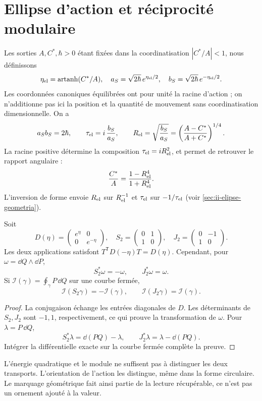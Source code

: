 \section{Ellipse d’action et réciprocité modulaire}
\label{sec:ellipse}
Les sorties $A,C^*,\hbar>0$ étant fixées dans la coordinatisation
$|C^*/A|<1$, nous définissons
\[
\eta_{\rm el}=\operatorname{artanh}(C^*/A),\quad
a_S=\sqrt{2\hbar}\,e^{\eta_{\rm el}/2},\quad
b_S=\sqrt{2\hbar}\,e^{-\eta_{\rm el}/2}.
\]
Les coordonnées canoniques équilibrées ont pour unité la racine d’action ;
on n’additionne pas ici la position et la quantité de mouvement sans coordinatisation dimensionnelle.
On a
\[
a_Sb_S=2\hbar,\qquad
\tau_{\rm el}=i\,\frac{b_S}{a_S},\qquad
R_{\rm el}=\sqrt{\frac{b_S}{a_S}}
=\left(\frac{A-C^*}{A+C^*}\right)^{1/4}.
\]
La racine positive détermine la composition $\tau_{\rm el}=iR_{\rm el}^2$,
et permet de retrouver le rapport angulaire :
\[
\frac{C^*}{A}=\frac{1-R_{\rm el}^4}{1+R_{\rm el}^4}.
\]
L’inversion de forme envoie $R_{\rm el}$ sur $R_{\rm el}^{-1}$ et
$\tau_{\rm el}$ sur $-1/\tau_{\rm el}$ (voir \ref{sec:ii-elipse-geometria}).

\begin{proposition}
Soit
\[
D(\eta)=\begin{pmatrix}e^\eta&0\\0&e^{-\eta}\end{pmatrix},
\quad
S_2=\begin{pmatrix}0&1\\1&0\end{pmatrix},
\quad
J_2=\begin{pmatrix}0&-1\\1&0\end{pmatrix}.
\]
Les deux applications satisfont $T^{\mathsf T}D(-\eta)T=D(\eta)$.
Cependant, pour $\omega=\dd Q\wedge\dd P$,
\[
S_2^*\omega=-\omega,\qquad J_2^*\omega=\omega.
\]
Si $\mathcal I(\gamma)=\oint_\gamma P\,\dd Q$ sur une courbe fermée,
\[
\mathcal I(S_2\gamma)=-\mathcal I(\gamma),\qquad
\mathcal I(J_2\gamma)=\mathcal I(\gamma).
\]
\end{proposition}
\begin{proof}
La conjugaison échange les entrées diagonales de $D$.
Les déterminants de $S_2,J_2$ sont $-1,1$, respectivement, ce qui
prouve la transformation de $\omega$. Pour $\lambda=P\,\dd Q$,
\[
S_2^*\lambda=\dd(PQ)-\lambda,\qquad
J_2^*\lambda=\lambda-\dd(PQ).
\]
Intégrer la différentielle exacte sur la courbe fermée complète la preuve.
\end{proof}

L’énergie quadratique et le module ne suffisent pas à distinguer les deux
transports. L’orientation de l’action les distingue, même
dans la forme circulaire. Le marquage géométrique fait ainsi partie de la lecture
récupérable, ce n’est pas un ornement ajouté à la valeur.
